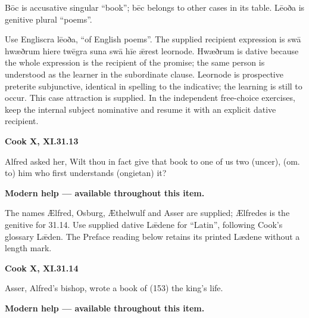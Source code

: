 Bōc is accusative singular “book”; bēc belongs to other cases in its table. Lēoða is genitive plural “poems”.

Use Engliscra lēoða, “of English poems”. The supplied recipient expression is swā hwæðrum hiere twēgra suna swā hīe ǣrest leornode. Hwæðrum is dative because the whole expression is the recipient of the promise; the same person is understood as the learner in the subordinate clause. Leornode is prospective preterite subjunctive, identical in spelling to the indicative; the learning is still to occur. This case attraction is supplied. In the independent free-choice exercises, keep the internal subject nominative and resume it with an explicit dative recipient.

\par\begin{minipage}{\linewidth}\raggedright
\textbf{Cook X, XI.31.13}

Alfred asked her, Wilt thou in fact give that book to one of us two (uncer), (om. to) him who first understands (ongietan) it?

\textbf{Modern help — available throughout this item.}

\end{minipage}\par\addvspace{4pt}

The names Ælfred, Osburg, Æthelwulf and Asser are supplied; Ælfredes is the genitive for 31.14. Use supplied dative Lǣdene for “Latin”, following Cook’s glossary Lǣden. The Preface reading below retains its printed Lædene without a length mark.

\par\begin{minipage}{\linewidth}\raggedright
\textbf{Cook X, XI.31.14}

Asser, Alfred’s bishop, wrote a book of (153) the king’s life.

\textbf{Modern help — available throughout this item.}

\end{minipage}\par\addvspace{4pt}

